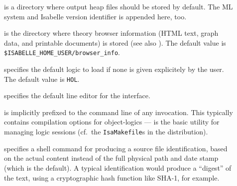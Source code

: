 \begin{isabellebody}
\begin{isamarkuptext}
\begin{description}
  \item[\hypertarget{setting.ISABELLE-OUTPUT}{\hyperlink{setting.ISABELLE-OUTPUT}{\mbox{}}}\isa{{\isachardoublequote}\isactrlsup {\isacharasterisk}{\isachardoublequote}}] is a
  directory where output heap files should be stored by default. The
  ML system and Isabelle version identifier is appended here, too.
  
  \item[\hypertarget{setting.ISABELLE-BROWSER-INFO}{\hyperlink{setting.ISABELLE-BROWSER-INFO}{\mbox{}}}] is the directory where
  theory browser information (HTML text, graph data, and printable
  documents) is stored (see also ).  The default
  value is \verb|$ISABELLE_HOME_USER/browser_info|.
  
  \item[\hypertarget{setting.ISABELLE-LOGIC}{\hyperlink{setting.ISABELLE-LOGIC}{\mbox{}}}] specifies the default logic to
  load if none is given explicitely by the user.  The default value is
  \verb|HOL|.
  
  \item[\hypertarget{setting.ISABELLE-LINE-EDITOR}{\hyperlink{setting.ISABELLE-LINE-EDITOR}{\mbox{}}}] specifies the default
  line editor for the \hyperlink{tool.tty}{\mbox{}} interface.

  \item[\hypertarget{setting.ISABELLE-USEDIR-OPTIONS}{\hyperlink{setting.ISABELLE-USEDIR-OPTIONS}{\mbox{}}}] is implicitly prefixed
  to the command line of any \hyperlink{tool.usedir}{\mbox{}} invocation. This
  typically contains compilation options for object-logics --- \hyperlink{tool.usedir}{\mbox{}} is the basic utility for managing logic sessions (cf.\ the
  \verb|IsaMakefile|s in the distribution).

  \item[\hypertarget{setting.ISABELLE-FILE-IDENT}{\hyperlink{setting.ISABELLE-FILE-IDENT}{\mbox{}}}] specifies a shell command
  for producing a source file identification, based on the actual
  content instead of the full physical path and date stamp (which is
  the default). A typical identification would produce a ``digest'' of
  the text, using a cryptographic hash function like SHA-1, for
  example.
  

\end{description}
\end{isamarkuptext}
\end{isabellebody}
